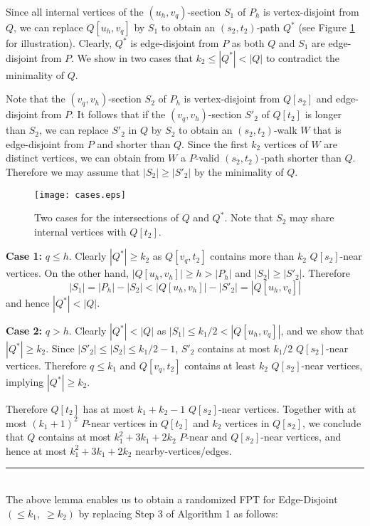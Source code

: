 \documentclass{llncs}
\def\qed{\rule{1.5mm}{3mm}}
\begin{document}
{	Since all internal vertices of the $(u_h, v_q)$-section $S_1$ of $P_h$ is vertex-disjoint from $Q$,
	we can replace $Q[u_h,v_q]$ by $S_1$ to obtain an $(s_2,t_2)$-path $Q^*$
	(see Figure \ref{fig:cases} for illustration).
	Clearly, $Q^*$ is edge-disjoint from $P$ as both $Q$ and $S_1$ are edge-disjoint from $P$. 
	We show in two cases that $k_2 \le |Q^*| < |Q|$ to contradict the minimality of $Q$.
	
	Note that the $(v_q, v_h)$-section $S_2$ of $P_h$ is vertex-disjoint from $Q[s_2]$ and 
	edge-disjoint from $P$. 
	It follows that if the $(v_q, v_h)$-section $S'_2$ of $Q[t_2]$ is longer
	than $S_2$, we can replace $S'_2$ in $Q$ by $S_2$ to obtain an 
	$(s_2,t_2)$-walk $W$ that is edge-disjoint from $P$ and shorter than $Q$.
	Since the first $k_2$ vertices of $W$ are distinct vertices, we can obtain from $W$
	a $P$-valid $(s_2,t_2)$-path shorter than $Q$.
	Therefore we may assume that $|S_2| \ge |S'_2|$ by the minimality of $Q$.
	
	\begin{figure}[hbt]
		\centerline{
			\texttt{[image: cases.eps]}
		}
		\caption{Two cases for the intersections of $Q$ and $Q^*$. Note that $S_2$ may share internal vertices with $Q[t_2]$. }
		\label{fig:cases}
	\end{figure}
	
	{\bf Case 1:} $q \le h$.
	Clearly $|Q^*| \ge k_2$ as $Q[v_q,t_2]$ contains 
	more than $k_2$ $Q[s_2]$-near vertices.
	On the other hand, $|Q[u_h, v_h]| \ge h > |P_h|$ and $|S_2| \ge |S'_2|$.
	Therefore  
	\[ |S_1| = |P_h| - |S_2| < |Q[u_h, v_h]| - |S'_2| = |Q[u_h, v_q]| \]
	and hence $|Q^*| < |Q|$. 
	
	{\bf Case 2:} $q > h$.
	Clearly $|Q^*| < |Q|$ as $|S_1| \le k_1/2 < |Q[u_h,v_q]|$,
	and we show that $|Q^*| \ge k_2$.  
	Since $|S'_2| \le |S_2| \le k_1/2 - 1$, $S'_2$ contains at most $k_1/2$ $Q[s_2]$-near vertices.
	Therefore $q \le k_1$ and $Q[v_q, t_2]$ contains at least $k_2$ $Q[s_2]$-near vertices,
	implying $|Q^*| \ge k_2$.
	
	Therefore $Q[t_2]$ has at most $k_1 + k_2 - 1$ $Q[s_2]$-near vertices.
	Together with at most $(k_1 + 1)^2$ $P$-near vertices in $Q[t_2]$ and $k_2$ vertices in $Q[s_2]$,
	we conclude that $Q$ contains at most $k^2_1 + 3k_1 + 2k_2$ $P$-near and $Q[s_2]$-near vertices,
	and hence at most $k^2_1 + 3k_1 + 2k_2$ nearby-vertices/edges.
	\qed} \\


The above lemma enables us to obtain a randomized FPT for {\sc Edge-Disjoint $(\le k_1, \; \ge k_2)$} 
by replacing Step 3 of Algorithm 1 as follows:
\end{document}
